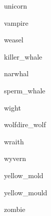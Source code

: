 \documentclass[a4paper,serif]{module}
\begin{document}
\begin{newmonster}{unicorn}\end{newmonster}

\begin{newmonster}{vampire}\end{newmonster}

\begin{newmonster}{weasel}\end{newmonster}


\begin{newmonster}{killer_whale}\end{newmonster}

\begin{newmonster}{narwhal}\end{newmonster}

\begin{newmonster}{sperm_whale}\end{newmonster}

\begin{newmonster}{wight}\end{newmonster}


\begin{newmonster2}{wolf}{dire_wolf}
\lipsum[1]
\end{newmonster2}

\begin{newmonster}{wraith}\end{newmonster}

\begin{newmonster}{wyvern}\end{newmonster}

\begin{newmonster}{yellow_mold}\end{newmonster}

\begin{newmonster}{yellow_mould}\end{newmonster}

\begin{newmonster}{zombie}\end{newmonster}
\end{document}
